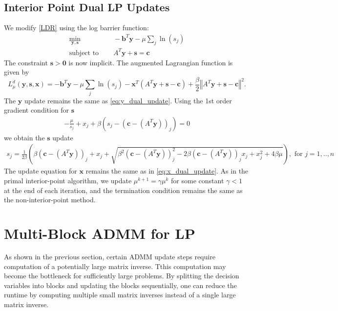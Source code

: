 \documentclass{article}
\begin{document}
\subsection*{Interior Point Dual LP Updates}
We modify \eqref{LDR} using the log barrier function:
\begin{align}
\min_{\mathbf{y}, \mathbf{s}} &\quad -\mathbf{b}^T\mathbf{y} - \mu \sum_j \ln (s_j)  \tag{LDRB}\label{LDRB} \\
\text{subject to } &\quad  A^T \mathbf{y}  + \mathbf{s} = \mathbf{c}  \nonumber
\end{align}
The constraint $\mathbf{s} > \mathbf{0}$ is now implicit. The augmented Lagrangian function is given by
\[
L_{\mu}^{d}(\mathbf{y},\mathbf{s},\mathbf{x})=-\mathbf{b}^{T}\mathbf{y}-\mu\sum_{j}\ln\left(s_{j}\right)-\mathbf{x}^{T}\left(A^{T}\mathbf{y}+\mathbf{s}-\mathbf{c}\right)+\frac{\beta}{2}\left\Vert A^{T}\mathbf{y}+\mathbf{s}-\mathbf{c}\right\Vert ^{2}.
\]
The $\mathbf{y}$ update remains the same as \eqref{eq:y_dual_update}. Using the 1st order gradient condition for $\mathbf{s}$
\begin{align}
- \frac{\mu}{s_j} + x_j  + \beta \left(s_j - (\mathbf{c} - (A^T \mathbf{y}))_j\right)= 0
\end{align}
we obtain the $\mathbf{s}$ update
\begin{align}
s_j = \frac{1}{2\beta}\left(\beta (\mathbf{c} - (A^T \mathbf{y}))_j + x_j  + \sqrt{\beta^2 (\mathbf{c} - (A^T \mathbf{y}))_j^2 - 2\beta (\mathbf{c} - (A^T \mathbf{y}))_j x_{j} + x_j^2 + 4\beta\mu } \right), \text{ for $j = 1,..,n$}
\end{align}
The update equation for $\mathbf{x}$ remains the same as in \eqref{eq:x_dual_update}. As in the primal interior-point algorithm, we update $\mu^{k+1} = \gamma \mu^k$ for some constant $\gamma<1$ at the end of each iteration, and the termination condition remains the same as the non-interior-point method.

\section{Multi-Block ADMM for LP}

As shown in the previous section, certain ADMM update steps require computation of a potentially large matrix inverse. Tthis computation may become the bottleneck for sufficiently large problems. By splitting the decision variables into blocks and updating the blocks sequentially, one can reduce the runtime by computing multiple small matrix inverses instead of a single large matrix inverse.
\end{document}
